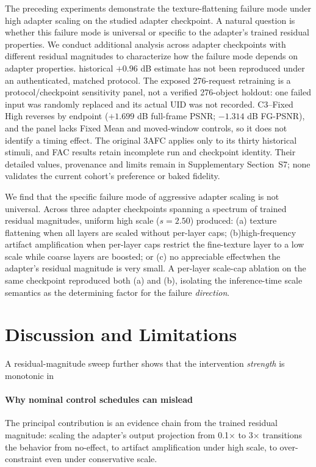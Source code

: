 \documentclass[times,twocolumn,final]{elsarticle}
\providecommand{\DIFadd}[1]{{\protect\color{blue} \sf #1}} %
\providecommand{\DIFdel}[1]{{\protect\color{red} \scriptsize #1}} %
\providecommand{\DIFaddbegin}{} %
\providecommand{\DIFaddend}{} %
\providecommand{\DIFdelbegin}{} %
\providecommand{\DIFdelend}{} %
\begin{document}
The \DIFdelbegin \DIFdel{preceding experiments demonstrate the texture-flattening failure mode under high adapter scaling on the studied adapter checkpoint. A natural question is whether this failure mode is universal or specific to the adapter's trained residual properties. We conduct additional analysis across adapter checkpoints with different residual magnitudes to characterize how the failure mode depends on adapter properties. }\DIFdelend \DIFaddbegin \DIFadd{historical $+0.96$ dB estimate has not been reproduced under an authenticated, matched protocol. The exposed 276-request retraining is a protocol/checkpoint sensitivity panel, not a verified 276-object holdout: one failed input was randomly replaced and its actual UID was not recorded. C3--Fixed High reverses by endpoint ($+1.699$ dB full-frame PSNR; $-1.314$ dB FG-PSNR), and the panel lacks Fixed Mean and moved-window controls, so it does not identify a timing effect. The original 3AFC applies only to its thirty historical stimuli, and FAC results retain incomplete run and checkpoint identity. Their detailed values, provenance and limits remain in Supplementary Section~S7; none validates the current cohort's preference or baked fidelity.
}\DIFaddend


\DIFdelbegin \DIFdel{We find that the specific failure mode of aggressive adapter scaling is not universal. Across three adapter checkpoints spanning a spectrum of trained residual magnitudes, uniform high scale ($s = 2.50$) produced: (a) texture flattening when all layers are scaled without per-layer caps; (b)high-frequency artifact amplification when per-layer caps restrict the fine-texture layer to a low scale while coarse layers are boosted; or (c) no appreciable effectwhen the adapter's residual magnitude is very small. A per-layer scale-cap ablation on the same checkpoint reproduced both (a) and (b), isolating the inference-time scale semantics as the determining factor for the failure \emph{direction}. }\DIFdelend \DIFaddbegin \FloatBarrier
\section{Discussion and Limitations}
\label{sec:limitations}
\DIFaddend

\DIFdelbegin \DIFdel{A residual-magnitude sweep further shows that the intervention \emph{strength} is monotonic in }\DIFdelend \DIFaddbegin \paragraph{Why nominal control schedules can mislead}
\DIFadd{The principal contribution is an evidence chain from }\DIFaddend the \DIFdelbegin \DIFdel{trained residual magnitude: scaling the adapter's output projection from 0.1$\times$ to 3$\times$ transitions the behavior from no-effect, to artifact amplification under high scale, to over-constraint even under conservative scale.
}%
\end{document}
